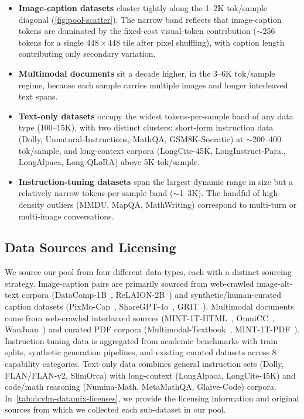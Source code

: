 \begin{itemize}[leftmargin=*,itemsep=1pt]
\item \textbf{Image-caption datasets} cluster tightly along the 1--2K tok/sample diagonal (\cref{fig:pool-scatter}). The narrow band reflects that image-caption tokens are dominated by the fixed-cost visual-token contribution ($\sim$256 tokens for a single $448{\times}448$ tile after pixel shuffling), with caption length contributing only secondary variation.
\item \textbf{Multimodal documents} sit a decade higher, in the 3--6K tok/sample regime, because each sample carries multiple images and longer interleaved text spans.
\item \textbf{Text-only datasets} occupy the widest tokens-per-sample band of any data type (100--15K), with two distinct clusters: short-form instruction data (Dolly, Unnatural-Instructions, MathQA, GSM8K-Socratic) at $\sim$200--400 tok/sample, and long-context corpora (LongCite-45K, LongInstruct-Para., LongAlpaca, Long-QLoRA) above 5K tok/sample.
\item \textbf{Instruction-tuning datasets} span the largest dynamic range in size but a relatively narrow tokens-per-sample band ($\sim$1--3K). The handful of high-density outliers (MMDU, MapQA, MathWriting) correspond to multi-turn or multi-image conversations.
\end{itemize}


\subsection{Data Sources and Licensing}\label{appsub:licensing}

We source our \dcvlm{} pool from four different data-types, each with a distinct sourcing strategy. Image-caption pairs are primarily sourced from web-crawled image-alt-text corpora (DataComp-1B~\citep{gadre2023datacomp}, ReLAION-2B~\citep{schuhmann2022laion}) and synthetic/human-curated caption datasets (PixMo-Cap~\citep{deitke2025molmo}, ShareGPT-4o~\citep{chen2024sharegpt4v}, GRIT~\citep{peng2023kosmos2}).
Multimodal documents come from web-crawled interleaved sources (MINT-1T-HTML~\citep{awadalla2024mint}, OmniCC~\citep{li2024omnicorpus}, WanJuan~\citep{he2023wanjuan}) and curated PDF corpora (Multimodal-Textbook~\citep{zhang2025textbook}, MINT-1T-PDF~\citep{awadalla2024mint}).
Instruction-tuning data is aggregated from academic benchmarks with train splits, synthetic generation pipelines, and existing curated datasets across 8 capability categories.
Text-only data combines general instruction sets (Dolly, FLAN/FLAN-v2, SlimOrca) with long-context (LongAlpaca, LongCite-45K) and code/math reasoning (Numina-Math, MetaMathQA, Glaive-Code) corpora. In~\cref{tab:dcvlm-datamix-licenses}, we provide the licensing information and original sources from which we collected each sub-dataset in our \dcvlm{} pool.

